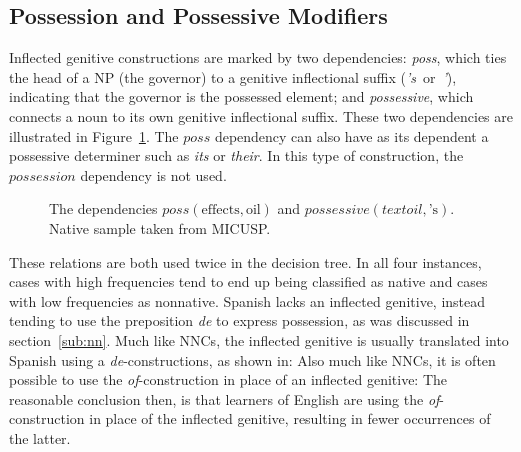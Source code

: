 \documentclass[main.tex]{subfiles}
\begin{document}
\subsection{Possession and Possessive Modifiers}

Inflected genitive constructions are marked by two dependencies: \textit{poss}, which ties the head of a NP (the governor) to a genitive inflectional suffix (\textit{'s}~or~\textit{'}), indicating that the governor is the possessed element; and \textit{possessive}, which connects a noun to its own genitive inflectional suffix. These two dependencies are illustrated in Figure~\ref{fig:poss-deps}. The $poss$ dependency can also have as its dependent a possessive determiner such as \textit{its} or \textit{their}. In this type of construction, the $possession$ dependency is not used. 

\begin{figure}[htbp]
\centering
{}
\caption{The dependencies $poss(\text{effects}, \text{oil})$ and $possessive(text{oil}, \text{'s})$. Native sample taken from MICUSP.}
\label{fig:poss-deps}
\end{figure}

These relations are both used twice in the decision tree. In all four instances, cases with high frequencies tend to end up being classified as native and cases with low frequencies as nonnative. Spanish lacks an inflected genitive, instead tending to use the preposition \textit{de} to express possession, as was discussed in section~\ref{sub:nn}. Much like NNCs, the inflected genitive is usually translated into Spanish using a \textit{de}-constructions, as shown in:
Also much like NNCs, it is often possible to use the \textit{of}-construction in place of an inflected genitive:
The reasonable conclusion then, is that learners of English are using the \textit{of}-construction in place of the inflected genitive, resulting in fewer occurrences of the latter.
\end{document}
